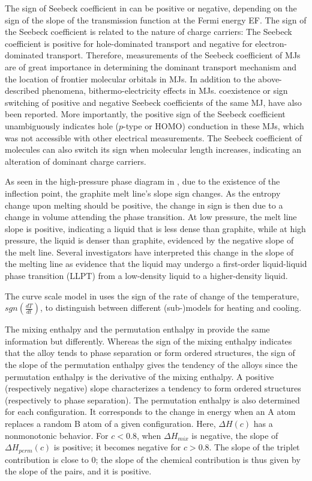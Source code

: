 \documentclass[11pt]{book}
\begin{document}
The sign of Seebeck coefficient in \cite{wang2020thermal} can be
positive or negative, depending on the sign of the slope of the transmission
function at the Fermi energy EF. The sign of the Seebeck coefficient
is related to the nature of charge carriers: The Seebeck coefficient
is positive for hole-dominated transport and negative for electron-dominated
transport. Therefore, measurements of the Seebeck coefficient of MJs
are of great importance in determining the dominant transport mechanism
and the location of frontier molecular orbitals in MJs. In addition
to the above-described phenomena, bithermo-electricity effects in
MJs. coexistence or sign switching of positive and negative Seebeck
coefficients of the same MJ, have also been reported. More importantly,
the positive sign of the Seebeck coefficient unambiguously indicates
hole ($p$-type or HOMO) conduction in these MJs, which was not accessible
with other electrical measurements. The Seebeck coefficient of molecules
can also switch its sign when molecular length increases, indicating
an alteration of dominant charge carriers.

As seen in the high-pressure phase diagram in \cite{hull2020liquid},
due to the existence of the inflection point, the graphite melt line's
slope sign changes. As the entropy change upon melting should be positive,
the change in sign is then due to a change in volume attending the
phase transition. At low pressure, the melt line slope is positive,
indicating a liquid that is less dense than graphite, while at high
pressure, the liquid is denser than graphite, evidenced by the negative
slope of the melt line. Several investigators have interpreted this
change in the slope of the melting line as evidence that the liquid
may undergo a first-order liquid-liquid phase transition (LLPT) from
a low-density liquid to a higher-density liquid.

The curve scale model in \cite{barz2021paraffins} uses the sign of
the rate of change of the temperature, $sgn\left(\frac{dT}{dt}\right)$,
to distinguish between different (sub-)models for heating and cooling.

The mixing enthalpy and the permutation enthalpy in \cite{berthier2021effective}
provide the same information but differently. Whereas the sign of
the mixing enthalpy indicates that the alloy tends to phase separation
or form ordered structures, the sign of the slope of the permutation
enthalpy gives the tendency of the alloys since the permutation enthalpy
is the derivative of the mixing enthalpy. A positive (respectively
negative) slope characterizes a tendency to form ordered structures
(respectively to phase separation). The permutation enthalpy is also
determined for each configuration. It corresponds to the change in
energy when an A atom replaces a random B atom of a given configuration.
Here, $\Delta H\left(c\right)$ has a nonmonotonic behavior. For $c<0.8$,
when $\Delta H_{mix}$ is negative, the slope of $\Delta H_{perm}\left(c\right)$
is positive; it becomes negative for $c>0.8$. The slope of the triplet
contribution is close to $0$; the slope of the chemical contribution
is thus given by the slope of the pairs, and it is positive.
\end{document}
